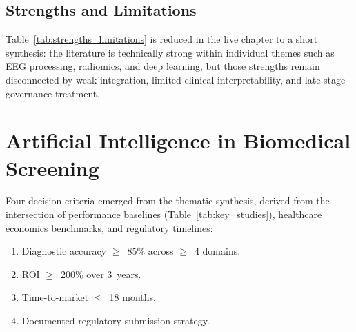 \subsection{Strengths and Limitations}

Table~\ref{tab:strengths_limitations} is reduced in the live chapter to a short synthesis: the literature is technically strong within individual themes such as EEG processing, radiomics, and deep learning, but those strengths remain disconnected by weak integration, limited clinical interpretability, and late-stage governance treatment.

\section{Artificial Intelligence in Biomedical Screening}

Four decision criteria emerged from the thematic synthesis, derived from the intersection of performance baselines (Table~\ref{tab:key_studies}), healthcare economics benchmarks, and regulatory timelines:
\begin{enumerate}[leftmargin=*, itemsep=1pt, label=(\arabic*)]
    \item Diagnostic accuracy $\geq$~85\% across $\geq$~4 domains.
    \item ROI $\geq$~200\% over 3~years.
    \item Time-to-market $\leq$~18 months.
    \item Documented regulatory submission strategy.
\end{enumerate}


%


